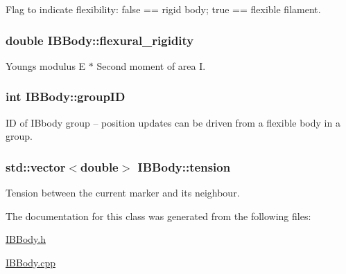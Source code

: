 Flag to indicate flexibility\+: false == rigid body; true == flexible filament. 

\subsubsection[{\texorpdfstring{flexural\+\_\+rigidity}{flexural_rigidity}}]{\setlength{\rightskip}{0pt plus 5cm}double I\+B\+Body\+::flexural\+\_\+rigidity\hspace{0.3cm}{\ttfamily [protected]}}\hypertarget{class_i_b_body_a4825a8ef9155062ff9d1011479bd4a9e}{}\label{class_i_b_body_a4825a8ef9155062ff9d1011479bd4a9e}


Young\textquotesingle{}s modulus E $\ast$ Second moment of area I. 

\subsubsection[{\texorpdfstring{group\+ID}{groupID}}]{\setlength{\rightskip}{0pt plus 5cm}int I\+B\+Body\+::group\+ID\hspace{0.3cm}{\ttfamily [protected]}}\hypertarget{class_i_b_body_a4674ade74a2b55ce60a656acfebb4a55}{}\label{class_i_b_body_a4674ade74a2b55ce60a656acfebb4a55}


ID of I\+Bbody group -- position updates can be driven from a flexible body in a group. 

\subsubsection[{\texorpdfstring{tension}{tension}}]{\setlength{\rightskip}{0pt plus 5cm}std\+::vector$<$double$>$ I\+B\+Body\+::tension\hspace{0.3cm}{\ttfamily [protected]}}\hypertarget{class_i_b_body_ab786e24bc2b303eefcf286e0138cb2d1}{}\label{class_i_b_body_ab786e24bc2b303eefcf286e0138cb2d1}


Tension between the current marker and its neighbour. 



The documentation for this class was generated from the following files\+:\begin{DoxyCompactItemize}
\item 
\hyperlink{_i_b_body_8h}{I\+B\+Body.\+h}\item 
\hyperlink{_i_b_body_8cpp}{I\+B\+Body.\+cpp}\end{DoxyCompactItemize}
